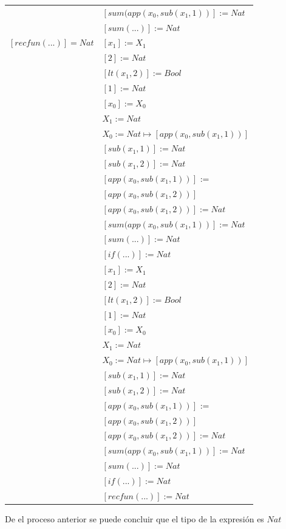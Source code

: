 \begin{exercise}
\begin{description}
\begin{center}
\begin{longtable}{ | l | l | }
			     & $[sum(app(x_0, sub(x_1,1))] := Nat$ \\
			     & $[sum(...)] := Nat$ \\
                     \hline 
                        $[recfun(...)] = Nat$ & $[x_1] := X_1$\\
                        & $[2] := Nat$\\ 
                        & $[lt(x_1 , 2)] := Bool$\\  
			     & $[1] := Nat$\\
			     & $[x_0] := X_0$\\
			     & $X_1 := Nat$\\
			     & $X_0 := Nat \mapsto [app(x_0, sub(x_1,1))]$\\
			     & $[sub(x_1,1)] := Nat$\\
			     & $[sub(x_1,2)] := Nat$ \\
			     & $[app(x_0, sub(x_1,1))]$ := \\
			     & $[app(x_0, sub(x_1,2))]$\\ 
			     & $[app(x_0, sub(x_1,2))] := Nat$ \\
			     & $[sum(app(x_0, sub(x_1,1))] := Nat$ \\
			     & $[sum(...)] := Nat$ \\
			     & $[if(...)] := Nat$  \\
                     \hline 
			     & $[x_1] := X_1$\\
                        & $[2] := Nat$\\ 
                        & $[lt(x_1 , 2)] := Bool$\\  
			     & $[1] := Nat$\\
			     & $[x_0] := X_0$\\
			     & $X_1 := Nat$\\
			     & $X_0 := Nat \mapsto [app(x_0, sub(x_1,1))]$\\
			     & $[sub(x_1,1)] := Nat$\\
			     & $[sub(x_1,2)] := Nat$ \\
			     & $[app(x_0, sub(x_1,1))]$ := \\
			     & $[app(x_0, sub(x_1,2))]$\\ 
			     & $[app(x_0, sub(x_1,2))] := Nat$ \\
			     & $[sum(app(x_0, sub(x_1,1))] := Nat$ \\
			     & $[sum(...)] := Nat$ \\
			     & $[if(...)] := Nat$  \\
                        & $[recfun(...)] := Nat$ \\ 
                    \hline
                \end{longtable}
            \end{center}
            De el proceso anterior se puede concluir que el tipo de la expresión es $Nat$
        \end{description}
    \end{exercise}
    
